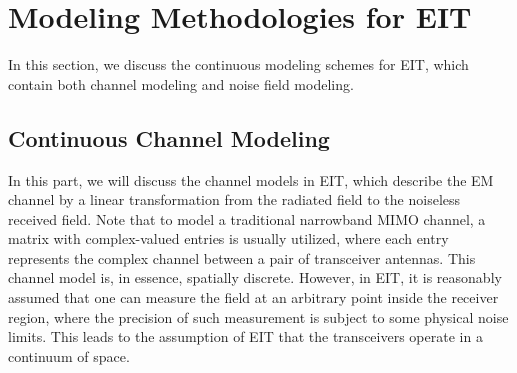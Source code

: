 \documentclass[journal,twocolumn]{IEEEtran}
\begin{document}


\section{Modeling Methodologies for EIT}
In this section, we discuss the continuous modeling schemes for EIT, which contain both channel modeling and noise field modeling. 

\subsection{Continuous Channel Modeling}
In this part, we will discuss the channel models in EIT, which describe the EM channel by a linear transformation from the radiated field to the noiseless received field.  
Note that to model a traditional narrowband MIMO channel, a matrix with complex-valued entries is usually utilized, where each entry represents the complex channel between a pair of transceiver antennas. 
This channel model is, in essence, spatially discrete. 
However, in EIT, it is reasonably assumed that one can measure the field at an arbitrary point inside the receiver region, where the precision of such measurement is subject to some physical noise limits. This leads to the assumption of EIT that the transceivers operate in a continuum of space.  
\end{document}
